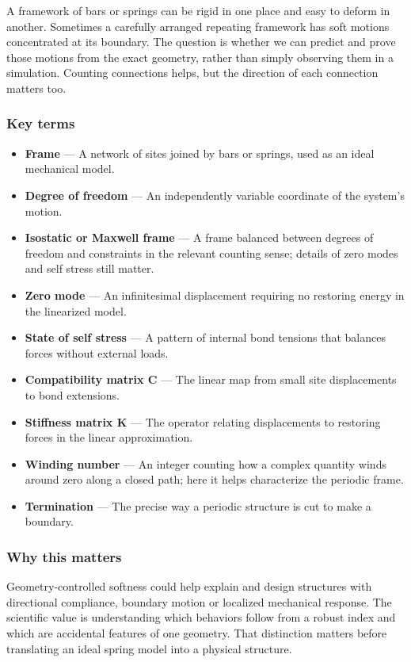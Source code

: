\documentclass[
  11pt,
]{article}
\begin{document}
A framework of bars or springs can be rigid in one place and easy to
deform in another. Sometimes a carefully arranged repeating framework
has soft motions concentrated at its boundary. The question is whether
we can predict and prove those motions from the exact geometry, rather
than simply observing them in a simulation. Counting connections helps,
but the direction of each connection matters too.

\subsubsection{Key terms}

\begin{itemize}
\item
  \textbf{Frame} --- A network of sites joined by bars or springs, used
  as an ideal mechanical model.
\item
  \textbf{Degree of freedom} --- An independently variable coordinate of
  the system's motion.
\item
  \textbf{Isostatic or Maxwell frame} --- A frame balanced between
  degrees of freedom and constraints in the relevant counting sense;
  details of zero modes and self stress still matter.
\item
  \textbf{Zero mode} --- An infinitesimal displacement requiring no
  restoring energy in the linearized model.
\item
  \textbf{State of self stress} --- A pattern of internal bond tensions
  that balances forces without external loads.
\item
  \textbf{Compatibility matrix C} --- The linear map from small site
  displacements to bond extensions.
\item
  \textbf{Stiffness matrix K} --- The operator relating displacements to
  restoring forces in the linear approximation.
\item
  \textbf{Winding number} --- An integer counting how a complex quantity
  winds around zero along a closed path; here it helps characterize the
  periodic frame.
\item
  \textbf{Termination} --- The precise way a periodic structure is cut
  to make a boundary.
\end{itemize}

\subsubsection{Why this matters}

Geometry-controlled softness could help explain and design structures
with directional compliance, boundary motion or localized mechanical
response. The scientific value is understanding which behaviors follow
from a robust index and which are accidental features of one geometry.
That distinction matters before translating an ideal spring model into a
physical structure.
\end{document}

